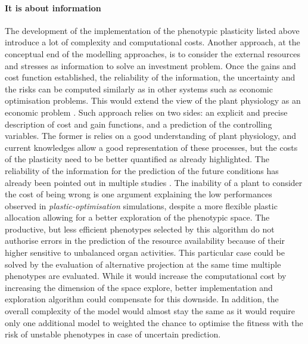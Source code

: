 
%
%

\paragraph{It is about information}

The development of the implementation of the phenotypic plasticity listed above introduce a lot of complexity and computational costs. Another approach, at the conceptual end of the modelling approaches, is to consider the external resources and stresses as information to solve an investment problem. Once the gains and cost function established, the reliability of the information, the uncertainty and the risks can be computed similarly as in other systems such as economic optimisation problems. This would extend the view of the plant physiology as an economic problem \parencite{westoby_time_2000, wright_worldwide_2004, mcmurtrie_leaf-trait_2011}. Such approach relies on two sides: an explicit and precise description of cost and gain functions, and a prediction of the controlling variables. The former is relies on a good understanding of plant physiology, and current knowledges allow a good representation of these processes, but the costs of the plasticity need to be better quantified as already highlighted. The reliability of the information for the prediction of the future conditions has already been pointed out in multiple studies \parencite{ dewitt_costs_1998, auld_re-evaluating_2009, richter_phenotypic_2012}. The inability of a plant to consider the cost of being wrong is one argument explaining the low performances observed in \textit{plastic-optimisation} simulations, despite a more flexible plastic allocation allowing for a better exploration of the phenotypic space. The productive, but less efficient phenotypes selected by this algorithm do not authorise errors in the prediction of the resource availability because of their higher sensitive to unbalanced organ activities. This particular case could be solved by the evaluation of alternative projection at the same time multiple phenotypes are evaluated. While it would increase the computational cost by increasing the dimension of the space explore, better implementation and exploration algorithm could compensate for this downside. In addition, the overall complexity of the model would almost stay the same as it would require only one additional model to weighted the chance to optimise the fitness with the risk of unstable phenotypes in case of uncertain prediction.

